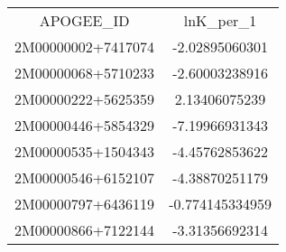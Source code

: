 \begin{table}
\begin{tabular}{cc}
APOGEE_ID & lnK_per_1 \\
2M00000002+7417074 & -2.02895060301 \\
2M00000068+5710233 & -2.60003238916 \\
2M00000222+5625359 & 2.13406075239 \\
2M00000446+5854329 & -7.19966931343 \\
2M00000535+1504343 & -4.45762853622 \\
2M00000546+6152107 & -4.38870251179 \\
2M00000797+6436119 & -0.774145334959 \\
2M00000866+7122144 & -3.31356692314 \\
\end{tabular}
\end{table}
